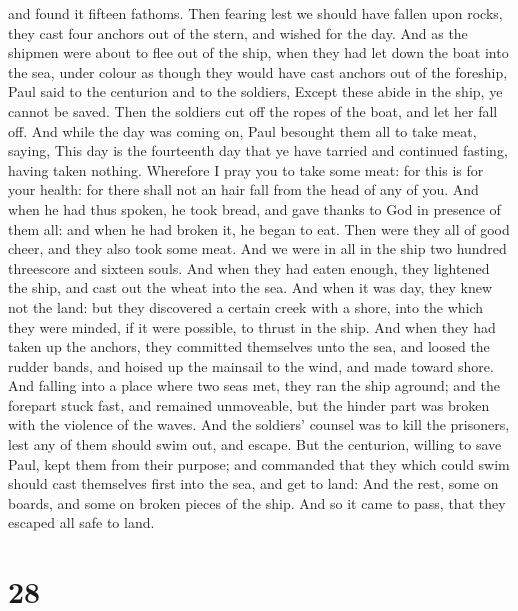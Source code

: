 and found it fifteen fathoms.  Then fearing lest we should
have fallen upon rocks, they cast four anchors out of the stern, and
wished for the day.  And as the shipmen were about to flee
out of the ship, when they had let down the boat into the sea, under
colour as though they would have cast anchors out of the foreship,
 Paul said to the centurion and to the soldiers, Except
these abide in the ship, ye cannot be saved.  Then the
soldiers cut off the ropes of the boat, and let her fall off.
 And while the day was coming on, Paul besought them all to
take meat, saying, This day is the fourteenth day that ye have tarried
and continued fasting, having taken nothing.  Wherefore I
pray you to take some meat: for this is for your health: for there shall
not an hair fall from the head of any of you.  And when he
had thus spoken, he took bread, and gave thanks to God in presence of
them all: and when he had broken it, he began to eat.  Then
were they all of good cheer, and they also took some meat. 
And we were in all in the ship two hundred threescore and sixteen souls.
 And when they had eaten enough, they lightened the ship,
and cast out the wheat into the sea.  And when it was day,
they knew not the land: but they discovered a certain creek with a
shore, into the which they were minded, if it were possible, to thrust
in the ship.  And when they had taken up the anchors, they
committed themselves unto the sea, and loosed the rudder bands, and
hoised up the mainsail to the wind, and made toward shore. 
And falling into a place where two seas met, they ran the ship aground;
and the forepart stuck fast, and remained unmoveable, but the hinder
part was broken with the violence of the waves.  And the
soldiers' counsel was to kill the prisoners, lest any of them should
swim out, and escape.  But the centurion, willing to save
Paul, kept them from their purpose; and commanded that they which could
swim should cast themselves first into the sea, and get to land:
 And the rest, some on boards, and some on broken pieces of
the ship. And so it came to pass, that they escaped all safe to land.

\hypertarget{section-27}{%
\section{28}\label{section-27}}

